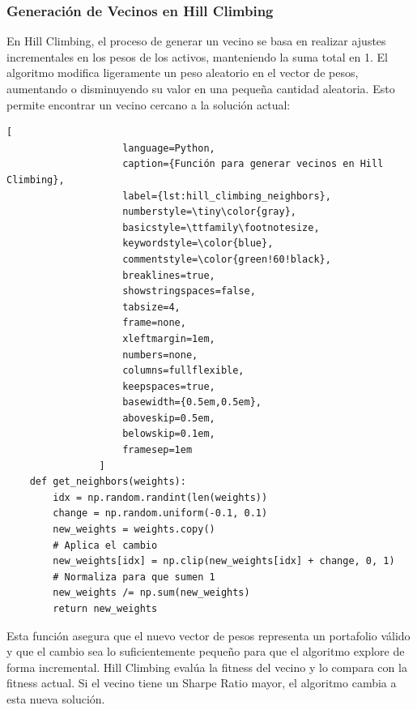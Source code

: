 \documentclass[9pt,a4paper,twoside]{rho-class/rho}
\begin{document}
            \subsubsection{Generación de Vecinos en Hill Climbing}
                En Hill Climbing, el proceso de generar un vecino se basa en realizar ajustes incrementales en los pesos de los activos, manteniendo la suma total en 1. El algoritmo modifica ligeramente un peso aleatorio en el vector de pesos, aumentando o disminuyendo su valor en una pequeña cantidad aleatoria. Esto permite encontrar un vecino cercano a la solución actual:
                \begin{lstlisting}[
                    language=Python,
                    caption={Función para generar vecinos en Hill Climbing},
                    label={lst:hill_climbing_neighbors},
                    numberstyle=\tiny\color{gray},
                    basicstyle=\ttfamily\footnotesize,
                    keywordstyle=\color{blue},
                    commentstyle=\color{green!60!black},
                    breaklines=true,
                    showstringspaces=false,
                    tabsize=4,
                    frame=none,
                    xleftmargin=1em,
                    numbers=none,
                    columns=fullflexible,
                    keepspaces=true,
                    basewidth={0.5em,0.5em},
                    aboveskip=0.5em,
                    belowskip=0.1em,
                    framesep=1em
                ]
    def get_neighbors(weights):
        idx = np.random.randint(len(weights))
        change = np.random.uniform(-0.1, 0.1)
        new_weights = weights.copy()
        # Aplica el cambio
        new_weights[idx] = np.clip(new_weights[idx] + change, 0, 1)  
        # Normaliza para que sumen 1
        new_weights /= np.sum(new_weights)  
        return new_weights
                \end{lstlisting}
                Esta función asegura que el nuevo vector de pesos representa un portafolio válido y que el cambio sea lo suficientemente pequeño para que el algoritmo explore de forma incremental. Hill Climbing evalúa la fitness del vecino y lo compara con la fitness actual. Si el vecino tiene un Sharpe Ratio mayor, el algoritmo cambia a esta nueva solución.
            
\end{document}
